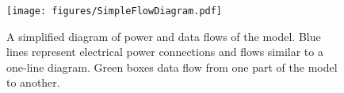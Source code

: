 \begin{figure}[ht]
	\centering
	\caption{A simplified diagram of power and data flows of the model. Blue lines represent electrical power connections and flows similar to a one-line diagram. Green boxes data flow from one part of the model to another.}
	\label{fig:abridged_flow_diagram}
	
	\texttt{[image: figures/SimpleFlowDiagram.pdf]}

\end{figure}